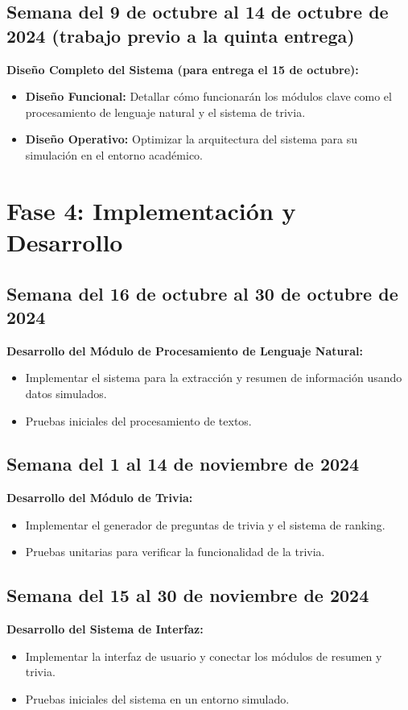 \documentclass{report}
\begin{document}
    \subsection*{Semana del 9 de octubre al 14 de octubre de 2024 (trabajo previo a la quinta entrega)}
    \textbf{Diseño Completo del Sistema (para entrega el 15 de octubre):}
    \begin{itemize}
        \item \textbf{Diseño Funcional:} Detallar cómo funcionarán los módulos clave como el procesamiento de lenguaje natural y el sistema de trivia.
        \item \textbf{Diseño Operativo:} Optimizar la arquitectura del sistema para su simulación en el entorno académico.
    \end{itemize}

    \section*{Fase 4: Implementación y Desarrollo}
    \subsection*{Semana del 16 de octubre al 30 de octubre de 2024}
    \textbf{Desarrollo del Módulo de Procesamiento de Lenguaje Natural:}
    \begin{itemize}
        \item Implementar el sistema para la extracción y resumen de información usando datos simulados.
        \item Pruebas iniciales del procesamiento de textos.
    \end{itemize}

    \subsection*{Semana del 1 al 14 de noviembre de 2024}
    \textbf{Desarrollo del Módulo de Trivia:}
    \begin{itemize}
        \item Implementar el generador de preguntas de trivia y el sistema de ranking.
        \item Pruebas unitarias para verificar la funcionalidad de la trivia.
    \end{itemize}

    \subsection*{Semana del 15 al 30 de noviembre de 2024}
    \textbf{Desarrollo del Sistema de Interfaz:}
    \begin{itemize}
        \item Implementar la interfaz de usuario y conectar los módulos de resumen y trivia.
        \item Pruebas iniciales del sistema en un entorno simulado.
    \end{itemize}
\end{document}
